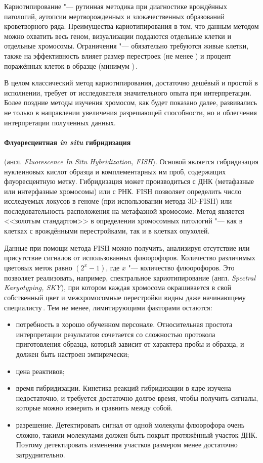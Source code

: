 \documentclass[a4paper,14pt]{extarticle}
\newcommand{\ecitep}[1]{\textenglish{\citep{#1}}}
\newcommand{\engterm}[1]{англ. \textenglish{\textit{#1}}}
\begin{document}
Кариотипирование "--- рутинная методика при диагностике врождённых патологий, аутопсии мертворожденных и злокачественных образований кроветворного ряда.
Преимущества кариотипирования в том, что данным методом можно охватить весь геном, визуализации поддаются отдельные клетки и отдельные хромосомы.
Ограничения "--- обязательно требуются живые клетки, также на эффективность влияет размер перестроек (не менее ) и процент поражённых клеток в образце (минимум )\,\ecitep{Sampson_2014}.

В целом классический метод кариотипирования, достаточно дешёвый и простой в исполнении, требует от исследователя значительного опыта при интерпретации.
Более поздние методы изучения хромосом, как будет показано далее, развивались не только в направлении увеличения разрешающей способности, но и облегчения интерпретации полученных данных.

\paragraph{Флуоресцентная \textit{in situ} гибридизация} (\engterm{Fluorescence In Situ Hybridization, FISH}).
Основой является гибридизация нуклеиновых кислот образца и комплементарных им проб, содержащих флуоресцентную метку.
Гибридизация может производиться с ДНК (метафазные или интерфазные хромосомы) или с РНК.
FISH позволяет определить число исследуемых локусов в геноме (при использовании метода 3D-FISH) или последовательность расположения на метафазной хромосоме.
Метод является <<золотым стандартом>> в определении хромосомных патологий "--- как в клетках с врождёнными перестройками, так и в клетках опухолей.

Данные при помощи метода FISH можно получить, анализируя отсутствие или присутствие сигналов от использованных флюорофоров.
Количество различимых цветовых меток равно $(2^x - 1)$, где $x$ "--- количество флюорофоров.
Это позволяет реализовать, например, спектральное кариотипирование (\engterm{Spectral Karyotyping, SKY}), при котором каждая хромосома окрашивается в свой собственный цвет и межхромосомные перестройки видны даже начинающему специалисту\,\ecitep{Guo_2014}.
Тем не менее, лимитирующими факторами остаются:

\begin{itemize}
	\item потребность в хорошо обученном персонале.
	 Относительная простота интерпретации результатов сочетается со сложностью протокола приготовления образца, который зависит от характера пробы и образца, и должен быть настроен эмпирически;
	\item цена реактивов;
	\item время гибридизации.
	 Кинетика реакций гибридизации в ядре изучена недостаточно, и требуется достаточно долгое время, чтобы получить сигналы, которые можно измерить и сравнить между собой.
	\item разрешение.
	 Детектировать сигнал от одной молекулы флюорофора очень сложно, такими молекулами должен быть покрыт протяжённый участок ДНК.
	 Поэтому детектировать изменения участков размером менее  достаточно затруднительно.
\end{itemize}
\end{document}
